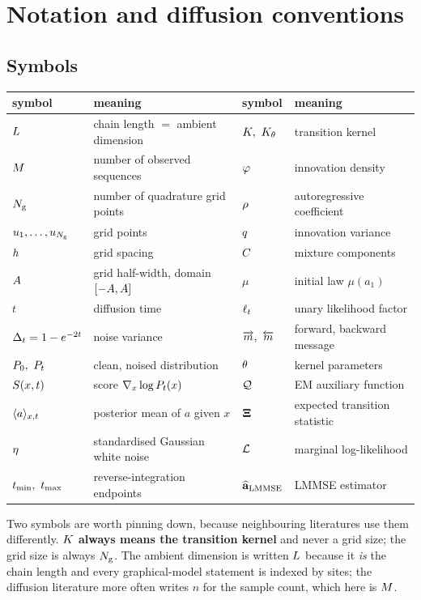 \section{Notation and diffusion conventions}
\label{app:notation}

\subsection{Symbols}

\begin{center}
\small
\begin{tabular}{ll@{\qquad}ll}
\toprule
symbol & meaning & symbol & meaning \\
\midrule
$L$ & chain length $=$ ambient dimension & $\kernel,\ \kernelth$ & transition kernel \\
$M$ & number of observed sequences & $\varphi$ & innovation density \\
$N_{\mathrm{g}}$ & number of quadrature grid points & $\rho$ & autoregressive coefficient \\
$u_{1},\dots,u_{N_{\mathrm{g}}}$ & grid points & $q$ & innovation variance \\
$h$ & grid spacing & $C$ & mixture components \\
$A$ & grid half-width, domain $[-A,A]$ & $\mu$ & initial law $\mu(a_1)$ \\
$t$ & diffusion time & $\ell_t$ & unary likelihood factor \\
$\Delta_t = 1-e^{-2t}$ & noise variance & $\lmsg,\ \rmsg$ & forward, backward message \\
$\Pz,\ \Pt$ & clean, noised distribution & $\theta$ & kernel parameters \\
$S(x,t)$ & score $\nabla_x\log P_t(x)$ & $\mathcal{Q}$ & EM auxiliary function \\
$\langle a \rangle_{x,t}$ & posterior mean of $a$ given $x$ & $\mathbf{\Xi}$ & expected transition statistic \\
$\mathbf{\eta}$ & standardised Gaussian white noise & $\mathcal{L}$ & marginal log-likelihood \\
$\tmin,\ \tmax$ & reverse-integration endpoints & $\widehat{\mathbf{a}}_{\mathrm{LMMSE}}$ & LMMSE estimator \\
\bottomrule
\end{tabular}
\end{center}

Two symbols are worth pinning down, because neighbouring literatures use them differently.
\textbf{$K$ always means the transition kernel} and never a grid size; the grid size is
always $N_{\mathrm{g}}$. The ambient dimension is written $L$ because it \emph{is} the chain length
and every graphical-model statement is indexed by sites; the diffusion literature more often
writes $n$ for the sample count, which here is $M$.

